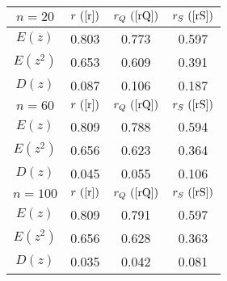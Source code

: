 \begin{tabular}{|c|c|c|c|}
\hline
$n = 20$ & $r ~(
\ref{r})$ & $r_Q ~(
\ref{rQ})$ & $r_S ~(
\ref{rS})$\\
\hline
$E(z)$ & 0.803 & 0.773 & 0.597\\
\hline
$E(z^2)$ & 0.653 & 0.609 & 0.391\\
\hline
$D(z)$ & 0.087 & 0.106 & 0.187\\
\hline
$n = 60$ & $r ~(
\ref{r})$ & $r_Q ~(
\ref{rQ})$ & $r_S ~(
\ref{rS})$\\
\hline
$E(z)$ & 0.809 & 0.788 & 0.594\\
\hline
$E(z^2)$ & 0.656 & 0.623 & 0.364\\
\hline
$D(z)$ & 0.045 & 0.055 & 0.106\\
\hline
$n = 100$ & $r ~(
\ref{r})$ & $r_Q ~(
\ref{rQ})$ & $r_S ~(
\ref{rS})$\\
\hline
$E(z)$ & 0.809 & 0.791 & 0.597\\
\hline
$E(z^2)$ & 0.656 & 0.628 & 0.363\\
\hline
$D(z)$ & 0.035 & 0.042 & 0.081\\
\hline
\end{tabular}